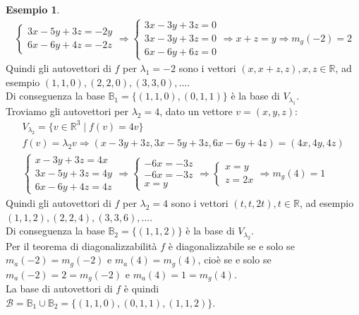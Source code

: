\documentclass[a4paper]{article}
\theoremstyle{definition}
\newtheorem*{es}{Esempio}
\begin{document}
\begin{es}
\begin{align*}
\begin{cases}
				3x - 5y + 3z = -2y \\
				6x - 6y + 4z = -2z
			\end{cases} \Rightarrow \begin{cases}
				3x - 3y + 3z = 0 \\
				3x - 3y + 3z = 0 \\
				6x - 6y + 6z = 0
			\end{cases} \Rightarrow x + z = y \Rightarrow m_g(-2) = 2
		\end{align*}
		Quindi gli autovettori di $f$ per $\lambda_1 = -2$ sono i vettori $(x, x + z, z), x, z \in \mathbb{R}$, ad esempio $(1, 1, 0), (2, 2, 0), (3, 3, 0), ...$. \\
		Di conseguenza la base $\mathbb{B}_1 = \{(1, 1, 0), (0, 1, 1)\}$ è la base di $V_{\lambda_1}$. \\
		Troviamo gli autovettori per $\lambda_2 = 4$, dato un vettore $v = (x, y, z)$:
		\begin{align*}
			V_{\lambda_2} = \{v \in \mathbb{R}^3 \mid f(v) = 4v\} \\
			f(v) = \lambda_2 v \Rightarrow (x - 3y + 3z, 3x - 5y + 3z, 6x - 6y + 4z) = (4x, 4y, 4z) \\
			\begin{cases}
				x - 3y + 3z = 4x \\
				3x - 5y + 3z = 4y \\
				6x - 6y + 4z = 4z
			\end{cases} \Rightarrow \begin{cases}
				-6x = - 3z \\
				-6x = - 3z \\
				x = y
			\end{cases} \Rightarrow \begin{cases}
				x = y \\
				z = 2x
			\end{cases} \Rightarrow m_g(4) = 1
		\end{align*}
		Quindi gli autovettori di $f$ per $\lambda_2 = 4$ sono i vettori $(t, t, 2t), t \in \mathbb{R}$, ad esempio $(1, 1, 2), (2, 2, 4), (3, 3, 6), ...$. \\
		Di conseguenza la base $\mathbb{B}_2 = \{(1, 1, 2)\}$ è la base di $V_{\lambda_2}$. \\
		Per il teorema di diagonalizzabilità $f$ è diagonalizzabile se e solo se $m_a(-2) = m_g(-2)$ e $m_a(4) = m_g(4)$, cioè se e solo se $m_a(-2) = 2 = m_g(-2)$ e $m_a(4) = 1 = m_g(4)$. \\
		La base di autovettori di $f$ è quindi $\mathcal{B} = \mathbb{B}_1 \cup \mathbb{B}_2 = \{(1, 1, 0), (0, 1, 1), (1, 1, 2)\}$.

\end{es}
\end{document}
